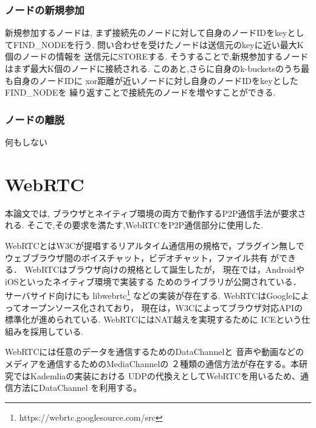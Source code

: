 \documentclass[sotsuron]{jcsie}
\begin{document}
\subsubsection{ノードの新規参加}
新規参加するノードは,
まず接続先のノードに対して自身のノードIDをkeyとしてFIND\_NODEを行う.
問い合わせを受けたノードは送信元のkeyに近い最大K個のノードの情報を
送信元にSTOREする.
そうすることで,新規参加するノードはまず最大K個のノードに接続される.
このあと,さらに自身のk-bucketsのうち最も自身のノードIDに
xor距離が近いノードに対し自身のノードIDをkeyとしたFIND\_NODEを
繰り返すことで接続先のノードを増やすことができる.
\subsubsection{ノードの離脱}
何もしない

\section{WebRTC}
本論文では,
ブラウザとネイティブ環境の両方で動作するP2P通信手法が要求される.
そこで,その要求を満たす,WebRTCをP2P通信部分に使用した.

WebRTCとはW3Cが提唱するリアルタイム通信用の規格で，プラグイン無しで
ウェブブラウザ間のボイスチャット，ビデオチャット，ファイル共有
ができる．
WebRTCはブラウザ向けの規格として誕生したが，
現在では，AndroidやiOSといったネイティブ環境で実装する
ためのライブラリが公開されている．
サーバサイド向けにも
libwebrtc\footnote{https://webrtc.googlesource.com/src}
などの実装が存在する.
WebRTCはGoogleによってオープンソース化されており，
現在は，W3Cによってブラウザ対応APIの標準化が進められている.
WebRTCにはNAT越えを実現するために
ICE\cite{rosenberg2010interactive}という仕組みを採用している.

WebRTCには任意のデータを通信するためのDataChannelと
音声や動画などのメディアを通信するためのMediaChannelの
２種類の通信方法が存在する。本研究ではKademliaの実装における
UDPの代換えとしてWebRTCを用いるため、通信方法にDataChannel
を利用する。
\end{document}
